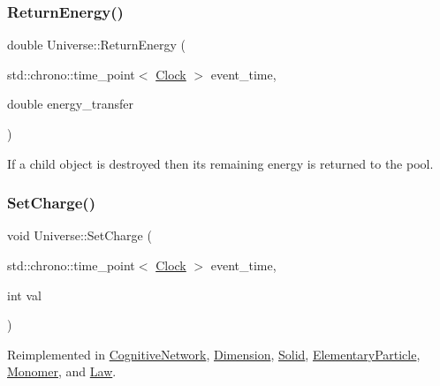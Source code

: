 \subsubsection{\texorpdfstring{Return\+Energy()}{ReturnEnergy()}}
{\footnotesize\ttfamily double Universe\+::\+Return\+Energy (\begin{DoxyParamCaption}\item[{std\+::chrono\+::time\+\_\+point$<$ \mbox{\hyperlink{universe_8h_a0ef8d951d1ca5ab3cfaf7ab4c7a6fd80}{Clock}} $>$}]{event\+\_\+time,  }\item[{double}]{energy\+\_\+transfer }\end{DoxyParamCaption})}

If a child object is destroyed then its remaining energy is returned to the pool.\mbox{\label{classUniverse_a3b3da7c86a7b75e5e5c0b7972ac82a87}} 
\subsubsection{\texorpdfstring{Set\+Charge()}{SetCharge()}}
{\footnotesize\ttfamily void Universe\+::\+Set\+Charge (\begin{DoxyParamCaption}\item[{std\+::chrono\+::time\+\_\+point$<$ \mbox{\hyperlink{universe_8h_a0ef8d951d1ca5ab3cfaf7ab4c7a6fd80}{Clock}} $>$}]{event\+\_\+time,  }\item[{int}]{val }\end{DoxyParamCaption})\hspace{0.3cm}{\ttfamily [virtual]}}



Reimplemented in \mbox{\hyperlink{classCognitiveNetwork_a99f801aeca299186cc706696696749b1}{Cognitive\+Network}}, \mbox{\hyperlink{classDimension_a6d3f7fa4a26b92d8ae6161a1b8bb8220}{Dimension}}, \mbox{\hyperlink{classSolid_a37503e6b25f912254414e778af2e75cd}{Solid}}, \mbox{\hyperlink{classElementaryParticle_abbc6d3c58509c4121df55bfef716d2f1}{Elementary\+Particle}}, \mbox{\hyperlink{classMonomer_a1ee35c888318e590082e6cd1772bb430}{Monomer}}, and \mbox{\hyperlink{classLaw_a2e780573f6285f88d167d45a2e243d01}{Law}}.

\mbox{\label{classUniverse_aa22202ae740eb1355529afcb13285e91}} 
